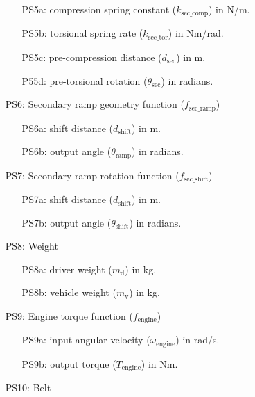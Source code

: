 \documentclass[12pt]{article}
\begin{document}
\begin{itemize}
\begin{itemize}
  \item [PS5a:] compression spring constant ($k_{\text{sec\_comp}}$) in N/m.
  \item [PS5b:] torsional spring rate ($k_{\text{sec\_tor}}$) in Nm/rad.
  \item [PS5c:] pre-compression distance ($d_{\text{sec}}$) in m.
  \item [P55d:] pre-torsional rotation ($\theta_{\text{sec}}$) in radians.
\end{itemize}

\item[PS6:] Secondary ramp geometry function ($f_{\text{sec\_ramp}}$)

\begin{itemize}
  \item [PS6a:] shift distance ($d_{\text{shift}}$) in m.
  \item [PS6b:] output angle ($\theta_{\text{ramp}}$) in radians.
\end{itemize}

\item[PS7:] Secondary ramp rotation function ($f_{\text{sec\_shift}}$)

\begin{itemize}
  \item [PS7a:] shift distance ($d_{\text{shift}}$) in m.
  \item [PS7b:] output angle ($\theta_{\text{shift}}$) in radians.
\end{itemize}

\item[PS8:] Weight

\begin{itemize}
  \item [PS8a:] driver weight ($m_{\text{d}}$) in kg.
  \item [PS8b:] vehicle weight ($m_{\text{v}}$) in kg.
\end{itemize}

\item[PS9:] Engine torque function ($f_{\text{engine}}$)

\begin{itemize}
  \item [PS9a:] input angular velocity ($\omega_{\text{engine}}$) in rad/s.
  \item [PS9b:] output torque ($T_{\text{engine}}$) in Nm.
\end{itemize}

\item[PS10:] Belt


\end{itemize}
\end{document}
